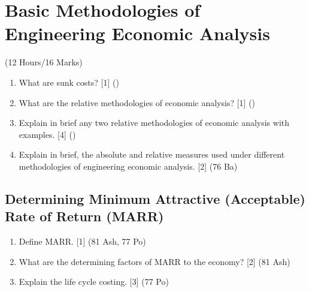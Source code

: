 \documentclass[12pt]{article}
\begin{document}
\section{Basic Methodologies of Engineering Economic Analysis}
	\begin{center}(12 Hours/16 Marks)\end{center}
	\begin{enumerate}[noitemsep, topsep = 0pt]
		\item What are sunk costs? \hfill [1] ()
		
		\item What are the relative methodologies of economic analysis? \hfill [1] ()
		
		\item Explain in brief any two relative methodologies of economic analysis with examples. \hfill [4] ()
		
		\item Explain in brief, the absolute and relative measures used under different methodologies of engineering economic analysis. \hspace{10.4cm} [2] (76 Ba)
		
	\end{enumerate}
	\subsection{Determining Minimum Attractive (Acceptable) Rate of Return (MARR)}
	\begin{enumerate}[noitemsep, topsep = 0pt]
		\item Define MARR. \hfill [1] (81 Ash, 77 Po)
		
		\item What are the determining factors of MARR to the economy? \hfill [2] (81 Ash)
		
		\item Explain the life cycle costing. \hfill [3] (77 Po)
	\end{enumerate}
\end{document}
